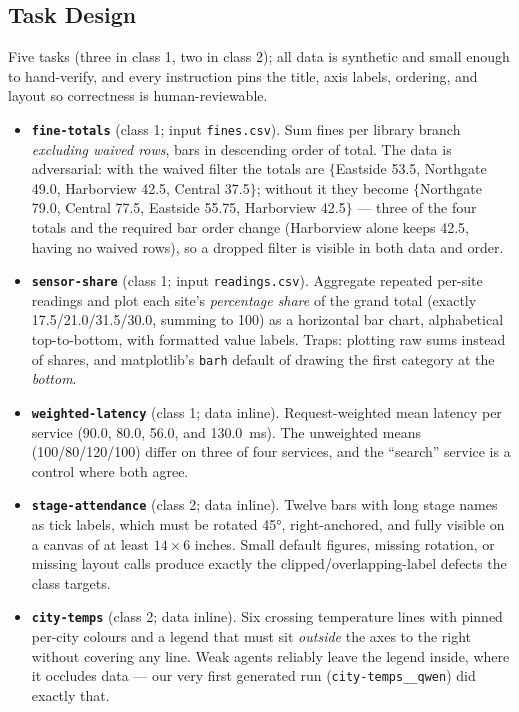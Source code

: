 \documentclass[11pt]{article}
\begin{document}
\subsection{Task Design}
Five tasks (three in class 1, two in class 2); all data is synthetic and
small enough to hand-verify, and every instruction pins the title, axis
labels, ordering, and layout so correctness is human-reviewable.

\begin{itemize}
\item \textbf{\texttt{fine-totals}} (class 1; input \texttt{fines.csv}).
  Sum fines per library branch \emph{excluding waived rows}, bars in
  descending order of total. The data is adversarial: with the waived filter
  the totals are $\{$Eastside 53.5, Northgate 49.0, Harborview 42.5, Central
  37.5$\}$; without it they become $\{$Northgate 79.0, Central 77.5, Eastside
  55.75, Harborview 42.5$\}$ --- three of the four totals and the required
  bar order change (Harborview alone keeps 42.5, having no waived rows),
  so a dropped filter is visible in both data and order.
\item \textbf{\texttt{sensor-share}} (class 1; input \texttt{readings.csv}).
  Aggregate repeated per-site readings and plot each site's \emph{percentage
  share} of the grand total (exactly 17.5/21.0/31.5/30.0, summing to 100) as
  a horizontal bar chart, alphabetical top-to-bottom, with formatted value
  labels. Traps: plotting raw sums instead of shares, and matplotlib's
  \texttt{barh} default of drawing the first category at the \emph{bottom}.
\item \textbf{\texttt{weighted-latency}} (class 1; data inline).
  Request-weighted mean latency per service (90.0, 80.0, 56.0, and
  130.0~ms). The
  unweighted means (100/80/120/100) differ on three of four services, and the
  ``search'' service is a control where both agree.
\item \textbf{\texttt{stage-attendance}} (class 2; data inline). Twelve bars
  with long stage names as tick labels, which must be rotated 45°,
  right-anchored, and fully visible on a canvas of at least $14 \times 6$
  inches. Small default figures, missing rotation, or missing layout calls
  produce exactly the clipped/overlapping-label defects the class targets.
\item \textbf{\texttt{city-temps}} (class 2; data inline). Six crossing
  temperature lines with pinned per-city colours and a legend that must sit
  \emph{outside} the axes to the right without covering any line. Weak agents
  reliably leave the legend inside, where it occludes data --- our very first
  generated run (\texttt{city-temps\_\_qwen}) did exactly that.
\end{itemize}
\end{document}
